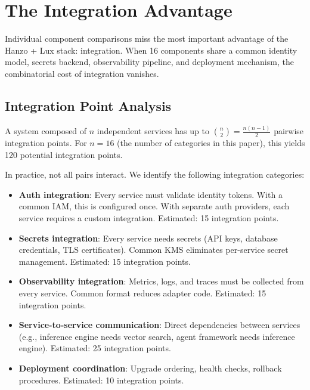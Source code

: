 \section{The Integration Advantage}

\label{sec:integrated}

Individual component comparisons miss the most important advantage of the Hanzo + Lux stack: integration. When 16 components share a common identity model, secrets backend, observability pipeline, and deployment mechanism, the combinatorial cost of integration vanishes.

\subsection{Integration Point Analysis}

A system composed of $n$ independent services has up to $\binom{n}{2} = \frac{n(n-1)}{2}$ pairwise integration points. For $n = 16$ (the number of categories in this paper), this yields 120 potential integration points.

In practice, not all pairs interact. We identify the following integration categories:

\begin{itemize}
    \item \textbf{Auth integration}: Every service must validate identity tokens. With a common IAM, this is configured once. With separate auth providers, each service requires a custom integration. Estimated: 15 integration points.
    \item \textbf{Secrets integration}: Every service needs secrets (API keys, database credentials, TLS certificates). Common KMS eliminates per-service secret management. Estimated: 15 integration points.
    \item \textbf{Observability integration}: Metrics, logs, and traces must be collected from every service. Common format reduces adapter code. Estimated: 15 integration points.
    \item \textbf{Service-to-service communication}: Direct dependencies between services (e.g., inference engine needs vector search, agent framework needs inference engine). Estimated: 25 integration points.
    \item \textbf{Deployment coordination}: Upgrade ordering, health checks, rollback procedures. Estimated: 10 integration points.
\end{itemize}

